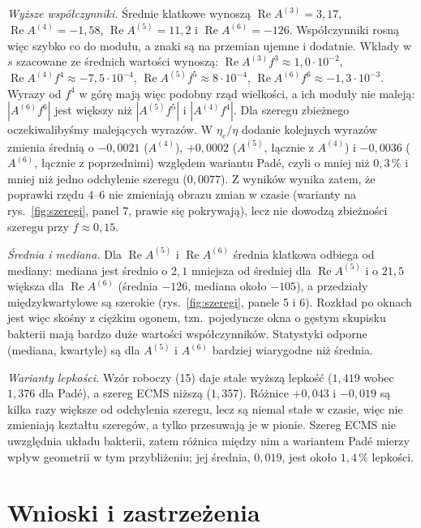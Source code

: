\documentclass[12pt,a4paper,twoside,openright]{report}
\theoremstyle{definition}
\theoremstyle{remark}
\newcommand{\ziel}[1]{{\color{green!50!black}#1}}
\renewcommand{\Re}{\operatorname{Re}}
\begin{document}
\ziel{\emph{Wyższe współczynniki.} Średnie klatkowe wynoszą $\Re A^{(3)}=3{,}17$, $\Re A^{(4)}=-1{,}58$, $\Re A^{(5)}=11{,}2$ i $\Re A^{(6)}=-126$. Współczynniki rosną więc szybko co do modułu, a znaki są na przemian ujemne i dodatnie. Wkłady w $s$ szacowane ze średnich wartości wynoszą: $\Re A^{(3)}f^3\approx1{,}0\cdot10^{-2}$, $\Re A^{(4)}f^4\approx-7{,}5\cdot10^{-4}$, $\Re A^{(5)}f^5\approx8\cdot10^{-4}$, $\Re A^{(6)}f^6\approx-1{,}3\cdot10^{-3}$. Wyrazy od $f^4$ w górę mają więc podobny rząd wielkości, a ich moduły nie maleją: $|A^{(6)}f^6|$ jest większy niż $|A^{(5)}f^5|$ i $|A^{(4)}f^4|$. Dla szeregu zbieżnego oczekiwalibyśmy malejących wyrazów. W $\eta_e/\eta$ dodanie kolejnych wyrazów zmienia średnią o $-0{,}0021$ ($A^{(4)}$), $+0{,}0002$ ($A^{(5)}$, łącznie z $A^{(4)}$) i $-0{,}0036$ ($A^{(6)}$, łącznie z poprzednimi) względem wariantu Padé, czyli o mniej niż $0{,}3\,\%$ i mniej niż jedno odchylenie szeregu ($0{,}0077$). Z wyników wynika zatem, że poprawki rzędu $4$--$6$ nie zmieniają obrazu zmian w czasie (warianty na rys.~\ref{fig:szeregi}, panel 7, prawie się pokrywają), lecz nie dowodzą zbieżności szeregu przy $f\approx0{,}15$.}

\ziel{\emph{Średnia i mediana.} Dla $\Re A^{(5)}$ i $\Re A^{(6)}$ średnia klatkowa odbiega od mediany: mediana jest średnio o $2{,}1$ mniejsza od średniej dla $\Re A^{(5)}$ i o $21{,}5$ większa dla $\Re A^{(6)}$ (średnia $-126$, mediana około $-105$), a przedziały międzykwartylowe są szerokie (rys.~\ref{fig:szeregi}, panele 5 i 6). Rozkład po oknach jest więc skośny z ciężkim ogonem, tzn.\ pojedyncze okna o gęstym skupisku bakterii mają bardzo duże wartości współczynników. Statystyki odporne (mediana, kwartyle) są dla $A^{(5)}$ i $A^{(6)}$ bardziej wiarygodne niż średnia.}

\ziel{\emph{Warianty lepkości.} Wzór roboczy (15) daje stale wyższą lepkość ($1{,}419$ wobec $1{,}376$ dla Padé), a szereg ECMS niższą ($1{,}357$). Różnice $+0{,}043$ i $-0{,}019$ są kilka razy większe od odchylenia szeregu, lecz są niemal stałe w czasie, więc nie zmieniają kształtu szeregów, a tylko przesuwają je w pionie. Szereg ECMS nie uwzględnia układu bakterii, zatem różnica między nim a wariantem Padé mierzy wpływ geometrii w tym przybliżeniu; jej średnia, $0{,}019$, jest około $1{,}4\,\%$ lepkości.}

\section{\ziel{Wnioski i zastrzeżenia}}
\end{document}
